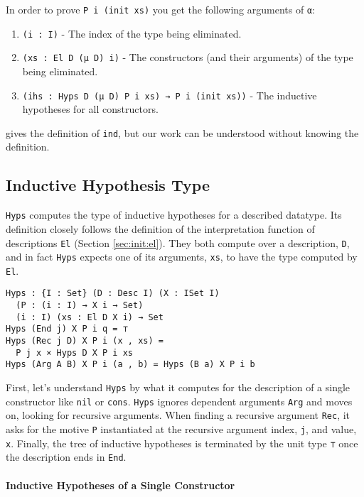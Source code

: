 \documentclass[preprint,nonatbib]{sigplanconf}
\newcommand{\refsec}[1]{Section \ref{sec:#1}}
\begin{document}
In order to prove {\tt P i (init xs)} you get the following
arguments of \verb+α+:

\begin{enumerate}
\item{{\tt (i : I)}} - The index of the type being eliminated.
\item{{\tt (xs : El D (μ D) i)}} - The constructors (and their arguments) of the type
  being eliminated.
\item{{\tt (ihs : Hyps D (μ D) P i xs) → P i (init xs))}} - The inductive
  hypotheses for all constructors.
\end{enumerate}

\citet{mcbride2010ornamental} gives the definition of {\tt ind}, but
our work can be understood without knowing the definition.

\subsection{Inductive Hypothesis Type}

{\tt Hyps} computes the type of inductive hypotheses for a described
datatype. Its definition closely follows the definition of
the interpretation function of descriptions {\tt El}
(\refsec{init:el}). They both compute over a description, {\tt D}, and in
fact {\tt Hyps} expects one of its arguments, {\tt xs}, to have the type
computed by {\tt El}.

\begin{verbatim}
Hyps : {I : Set} (D : Desc I) (X : ISet I)
  (P : (i : I) → X i → Set)
  (i : I) (xs : El D X i) → Set
Hyps (End j) X P i q = ⊤
Hyps (Rec j D) X P i (x , xs) =
  P j x × Hyps D X P i xs
Hyps (Arg A B) X P i (a , b) = Hyps (B a) X P i b
\end{verbatim}

First, let's understand {\tt Hyps} by what it computes for the
description of a single constructor like {\tt nil} or {\tt cons}.
{\tt Hyps} ignores dependent arguments {\tt Arg} and moves on, looking
for recursive arguments. When finding a recursive argument {\tt Rec}, it
asks for the motive {\tt P} instantiated at the recursive argument index, {\tt j}, and value, {\tt x}.
Finally, the tree of inductive hypotheses is terminated by the unit
type {\tt ⊤} once the description ends in {\tt End}.

\paragraph{Inductive Hypotheses of a Single Constructor}
\end{document}
